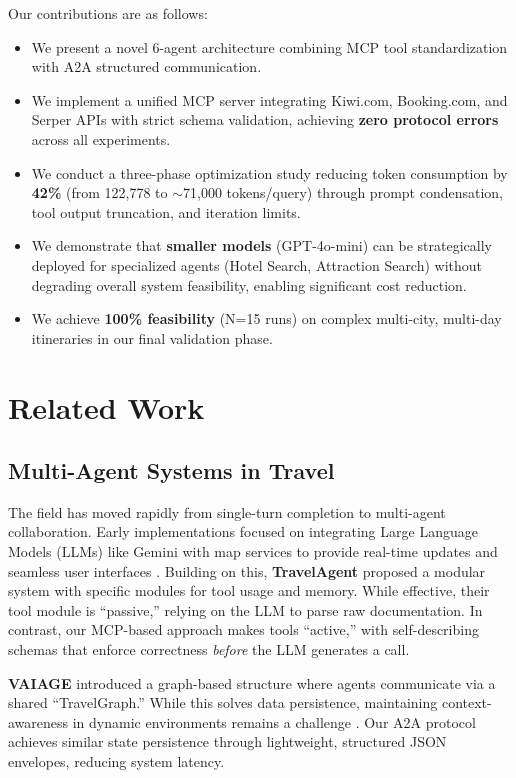 \documentclass[10pt,twocolumn]{article}
\begin{document}
Our contributions are as follows:
\begin{itemize}
    \item We present a novel 6-agent architecture combining MCP tool standardization with A2A structured communication.
    \item We implement a unified MCP server integrating Kiwi.com, Booking.com, and Serper APIs with strict schema validation, achieving \textbf{zero protocol errors} across all experiments.
    \item We conduct a three-phase optimization study reducing token consumption by \textbf{42\%} (from 122,778 to $\sim$71,000 tokens/query) through prompt condensation, tool output truncation, and iteration limits.
    \item We demonstrate that \textbf{smaller models} (GPT-4o-mini) can be strategically deployed for specialized agents (Hotel Search, Attraction Search) without degrading overall system feasibility, enabling significant cost reduction.
    \item We achieve \textbf{100\% feasibility} (N=15 runs) on complex multi-city, multi-day itineraries in our final validation phase.
\end{itemize}

\section{Related Work}

\subsection{Multi-Agent Systems in Travel}
The field has moved rapidly from single-turn completion to multi-agent collaboration. Early implementations focused on integrating Large Language Models (LLMs) like Gemini with map services to provide real-time updates and seamless user interfaces \cite{ravindra2025seamless}. Building on this, \textbf{TravelAgent} \cite{chen2024travelagent} proposed a modular system with specific modules for tool usage and memory. While effective, their tool module is ``passive,'' relying on the LLM to parse raw documentation. In contrast, our MCP-based approach makes tools ``active,'' with self-describing schemas that enforce correctness \textit{before} the LLM generates a call.

\textbf{VAIAGE} \cite{ge2025vaiage} introduced a graph-based structure where agents communicate via a shared ``TravelGraph.'' While this solves data persistence, maintaining context-awareness in dynamic environments remains a challenge \cite{anitha2025intelligent}. Our A2A protocol achieves similar state persistence through lightweight, structured JSON envelopes, reducing system latency.
\end{document}
